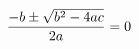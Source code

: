 \documentclass[preview]{standalone}
\begin{document}
\begin{align*}
\special{dvisvgm:raw <g id='unique000'>}\frac{-b \pm \sqrt{b^2 - 4ac}}{2a} &= 0\special{dvisvgm:raw </g>}
\end{align*}
\end{document}
